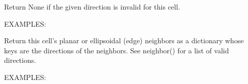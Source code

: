 \documentclass[a4paper,12ptopenany,oneside,english]{sphinxmanual}
\begin{document}
\begin{fulllineitems}
\begin{fulllineitems}
\sphinxAtStartPar
Return None if the given direction is invalid for this cell.

\sphinxAtStartPar
EXAMPLES:

\begin{sphinxVerbatim}[commandchars=\\\{\}]
   \PYG{p}{[} \PYG{p}{]}
\end{sphinxVerbatim}

\end{fulllineitems}


\begin{fulllineitems}
\label{\detokenize{dggs:rhealpixdggs.dggs.Cell.neighbors}}
\pysigstartsignatures
{}
\pysigstopsignatures
\sphinxAtStartPar
Return this cell’s planar or ellipsoidal (edge) neighbors
as a dictionary whose keys are the directions of the neighbors.
See neighbor() for a list of valid directions.

\sphinxAtStartPar
EXAMPLES:

\begin{sphinxVerbatim}[commandchars=\\\{\}]
   \PYG{p}{[} \PYG{p}{]}
    
     
\end{sphinxVerbatim}


\end{fulllineitems}
\end{fulllineitems}
\end{document}
